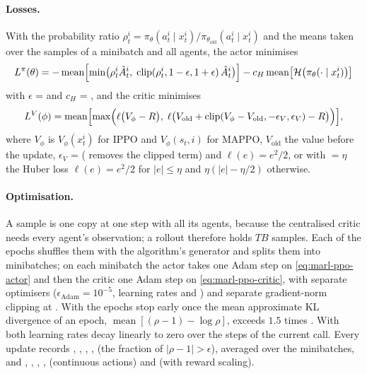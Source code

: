 \paragraph{Losses.} With the probability ratio
$\rho^i_t = \pi_\theta(a^i_t \mid x^i_t) / \pi_{\theta_\text{old}}(a^i_t \mid
x^i_t)$ and the means taken over the samples of a minibatch and all agents,
the actor minimises
\begin{equation}
  L^{\pi}(\theta) = -\operatorname{mean}\Bigl[\min\bigl(\rho^i_t \hat A^i_t,\;
    \operatorname{clip}(\rho^i_t, 1 - \epsilon, 1 + \epsilon)\, \hat A^i_t\bigr)\Bigr]
    - c_H \operatorname{mean}\bigl[\mathcal{H}\bigl(\pi_\theta(\cdot \mid x^i_t)\bigr)\bigr]
  \label{eq:marl-ppo-actor}
\end{equation}
with $\epsilon$ =  and $c_H$ = , and the
critic minimises
\begin{equation}
  L^{V}(\phi) = \operatorname{mean}\Bigl[\max\Bigl(\ell\bigl(V_\phi - R\bigr),\;
    \ell\bigl(V_\text{old} + \operatorname{clip}(V_\phi - V_\text{old},
    -\epsilon_V, \epsilon_V) - R\bigr)\Bigr)\Bigr],
  \label{eq:marl-ppo-critic}
\end{equation}
where $V_\phi$ is $V_\phi(x^i_t)$ for IPPO and $V_\phi(s_t, i)$ for MAPPO,
$V_\text{old}$ the value before the update, $\epsilon_V$ =
 ( removes the clipped term) and
$\ell(e) = e^2/2$, or with  $=\eta$ the Huber loss
$\ell(e) = e^2/2$ for $|e| \le \eta$ and $\eta(|e| - \eta/2)$ otherwise.

\paragraph{Optimisation.} A sample is one copy at one step with all its agents,
because the centralised critic needs every agent's observation; a rollout
therefore holds $T B$ samples. Each of the  epochs shuffles
them with the algorithm's generator and splits them into
 minibatches; on each minibatch the actor takes one Adam
step on \eqref{eq:marl-ppo-actor} and then the critic one Adam step on
\eqref{eq:marl-ppo-critic}, with separate optimisers ($\epsilon_\text{Adam} =
10^{-5}$, learning rates  and ) and separate
gradient-norm clipping at . With  the
epochs stop early once the mean approximate KL divergence of an epoch,
$\operatorname{mean}[(\rho - 1) - \log \rho]$, exceeds $1.5$ times
. With  both learning rates decay linearly to
zero over the steps of the current  call. Every update records
, , , ,
 (the fraction of $|\rho - 1| > \epsilon$), averaged over
the minibatches, and , ,
, ,  (continuous
actions) and  (with reward scaling).

